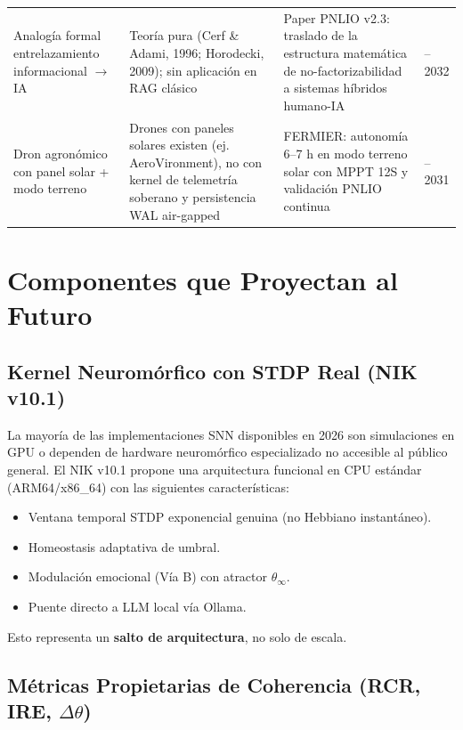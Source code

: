 \documentclass[12pt,a4paper]{article}
\begin{document}
\begin{longtable}{>{\raggedright\arraybackslash}p{4.2cm} >{\raggedright\arraybackslash}p{4.5cm} >{\raggedright\arraybackslash}p{4.5cm} >{\raggedright\arraybackslash}p{3.5cm}}
Analogía formal entrelazamiento informacional $\rightarrow$ IA & Teoría pura (Cerf \& Adami, 1996; Horodecki, 2009); sin aplicación en RAG clásico & Paper PNLIO v2.3: traslado de la estructura matemática de no-factorizabilidad a sistemas híbridos humano-IA & 2030--2032 \\
\addlinespace

Dron agronómico con panel solar + modo terreno & Drones con paneles solares existen (ej. AeroVironment), no con kernel de telemetría soberano y persistencia WAL air-gapped & FERMIER: autonomía 6--7 h en modo terreno solar con MPPT 12S y validación PNLIO continua & 2029--2031 \\

\end{longtable}

\section{Componentes que Proyectan al Futuro}

\subsection{Kernel Neuromórfico con STDP Real (NIK v10.1)}

La mayoría de las implementaciones SNN disponibles en 2026 son simulaciones en GPU o dependen de hardware neuromórfico especializado no accesible al público general. El NIK v10.1 propone una arquitectura funcional en CPU estándar (ARM64/x86\_64) con las siguientes características:

\begin{itemize}[leftmargin=2cm]
    \item Ventana temporal STDP exponencial genuina (no Hebbiano instantáneo).
    \item Homeostasis adaptativa de umbral.
    \item Modulación emocional (Vía B) con atractor $\theta_\infty$.
    \item Puente directo a LLM local vía Ollama.
\end{itemize}

Esto representa un \textbf{salto de arquitectura}, no solo de escala.

\subsection{Métricas Propietarias de Coherencia (RCR, IRE, $\Delta\theta$)}
\end{document}
